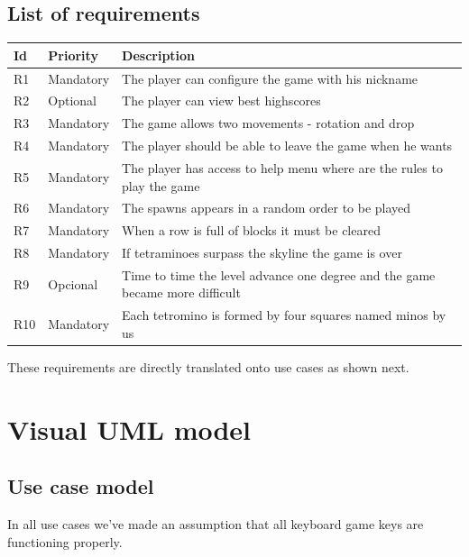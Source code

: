 \documentclass[a4paper]{article}
\begin{document}
\subsection{List of requirements}
\label{sec:requirements}
\begin{table}[h]
	\centering
	\label{tab:list-of-requirements}
	\begin{tabular}{|l|l|p{9cm}|}
		\hline
		\textbf{Id} & \textbf{Priority} & \textbf{Description} \\ \hline
		R1 & Mandatory         & The player can configure the game with his nickname \\ \hline
		R2 & Optional          & The player can view best highscores \\ \hline
		R3 & Mandatory         & The game allows two movements - rotation and drop \\ \hline
		R4 & Mandatory         & The player should be able to leave the game when he wants \\ \hline
		R5 & Mandatory         & The player has access to help menu where are the rules to play the game \\ \hline
		R6 & Mandatory         & The spawns appears in a random order to be played\\ \hline
		R7 & Mandatory         & When a row is full of blocks it must be cleared \\ \hline
		R8 & Mandatory         & If tetraminoes surpass the skyline the game is over \\ \hline
		R9 & Opcional          & Time to time the level advance one degree and the game became more difficult \\ \hline
		R10 & Mandatory        & Each tetromino is formed by four squares named minos by us \\ \hline
	\end{tabular}
\end{table}

These requirements are directly translated onto use cases as shown next.
\section{Visual UML model} 


\subsection{Use case model}

In all use cases we've made an assumption that all keyboard game keys are functioning properly.
\end{document}
